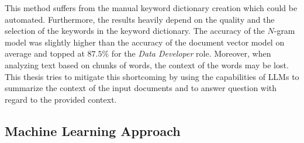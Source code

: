 \documentclass[draft,final]{thesisclass} %
\begin{document}
This method suffers from the manual keyword dictionary creation which could be automated. 
Furthermore, the results heavily depend on the quality and the selection of the keywords in the keyword dictionary.
The accuracy of the $N$-gram model was slightly higher than the accuracy of the document vector model on average and topped at $87.5\%$ for the \textit{Data Developer} role.
Moreover, when analyzing text based on chunks of words, the context of the words may be lost.
This thesis tries to mitigate this shortcoming by using the capabilities of \acs{LLM}s to summarize the context of the input documents and to answer question with regard to the provided context.

\subsection{Machine Learning Approach} \label{machine_learning_approach}
\end{document}
